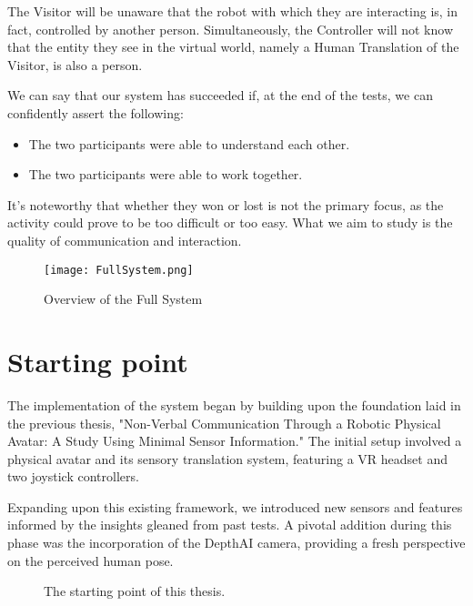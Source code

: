 \documentclass{Configuration_Files/PoliMi3i_thesis}
\begin{document}
The Visitor will be unaware that the robot with which they are interacting is, in fact, controlled by another person. Simultaneously, the Controller will not know that the entity they see in the virtual world, namely a Human Translation of the Visitor, is also a person.

We can say that our system has succeeded if, at the end of the tests, we can confidently assert the following:

\begin{itemize}
    \item The two participants were able to understand each other.
    \item The two participants were able to work together.
\end{itemize}
It's noteworthy that whether they won or lost is not the primary focus, as the activity could prove to be too difficult or too easy. What we aim to study is the quality of communication and interaction.

\begin{figure}[h]
    \centering
    \texttt{[image: FullSystem.png]}
    \caption{Overview of the Full System}
    \label{fig:full_system}
\end{figure}


\section{Starting point}
The implementation of the system began by building upon the foundation laid in the previous thesis, "Non-Verbal Communication Through a Robotic Physical Avatar: A Study Using Minimal Sensor Information." The initial setup involved a physical avatar and its sensory translation system, featuring a VR headset and two joystick controllers.

Expanding upon this existing framework, we introduced new sensors and features informed by the insights gleaned from past tests. A pivotal addition during this phase was the incorporation of the DepthAI camera, providing a fresh perspective on the perceived human pose. 

\begin{figure}[H]
    \centering
    \quad
    \caption{The starting point of this thesis.}
    \label{fig:quadtree2}
\end{figure}
\end{document}
